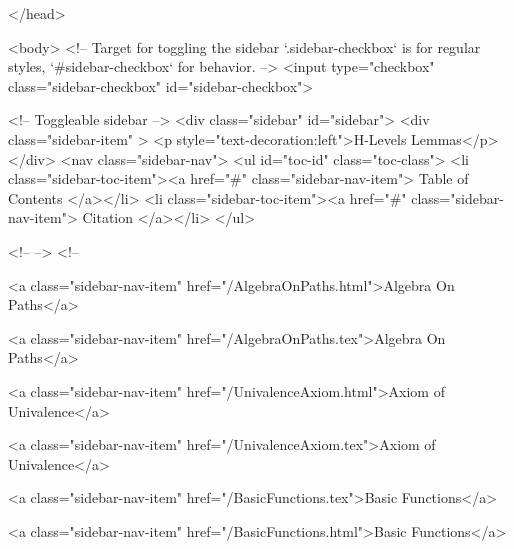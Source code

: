   
</head>




  <body>
    <!-- Target for toggling the sidebar `.sidebar-checkbox` is for regular
     styles, `#sidebar-checkbox` for behavior. -->
<input type="checkbox" class="sidebar-checkbox" id="sidebar-checkbox">

<!-- Toggleable sidebar -->
<div class="sidebar" id="sidebar">
  <div class="sidebar-item" >
    <p style="text-decoration:left">H-Levels Lemmas</p>
  </div>
  <nav class="sidebar-nav">
    <ul id="toc-id" class="toc-class">
  <li class="sidebar-toc-item"><a href="#" class="sidebar-nav-item"> Table of Contents </a></li>
  <li class="sidebar-toc-item"><a href="#" class="sidebar-nav-item"> Citation </a></li>
</ul>


    <!--  -->
    <!-- 
      
    
      
    
      
    
      
        
      
    
      
        
          <a class="sidebar-nav-item" href="/AlgebraOnPaths.html">Algebra On Paths</a>
        
      
    
      
        
          <a class="sidebar-nav-item" href="/AlgebraOnPaths.tex">Algebra On Paths</a>
        
      
    
      
        
          <a class="sidebar-nav-item" href="/UnivalenceAxiom.html">Axiom of Univalence</a>
        
      
    
      
        
          <a class="sidebar-nav-item" href="/UnivalenceAxiom.tex">Axiom of Univalence</a>
        
      
    
      
        
          <a class="sidebar-nav-item" href="/BasicFunctions.tex">Basic Functions</a>
        
      
    
      
        
          <a class="sidebar-nav-item" href="/BasicFunctions.html">Basic Functions</a>
        
      
    
      
        
